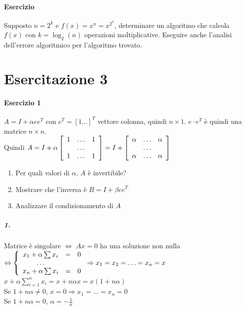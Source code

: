 \documentclass[10pt]{book}
\begin{document}
\paragraph{Esercizio} Supposto $n = 2^k$ e $f(x) = x^n = x^{2^k}$, determinare un algoritmo che calcola $f(x)$ con $k = \log_2(n)$ operazioni moltiplicative. Eseguire anche l'analisi dell'errore algoritmico per l'algoritmo trovato.
\pagebreak
\section{Esercitazione 3}
\paragraph{Esercizio 1}
$A = I + \alpha e e^T$ con $e^T = [1\ldots ]^T$ vettore colonna, quindi $n \times 1$. $e\cdot e^T$ è quindi una matrice $n \times n$.\\
Quindi $A = I + \alpha\left[
\begin{array}{c c c}
	1 & \ldots & 1\\
	 & \ldots\\
	1 & \ldots & 1
\end{array}
\right]
= I + \left[
\begin{array}{c c c}
	\alpha & \ldots & \alpha\\
	 & \ldots\\
	\alpha & \ldots & \alpha
\end{array}
\right]
$
\begin{enumerate}
	\item Per quali valori di $\alpha$, $A$ è invertibile?
	\item Mostrare che l'inversa è $B = I + \beta e e^T$
	\item Analizzare il condizionamento di $A$
\end{enumerate}
\subparagraph{1.} Matrice è singolare $\Leftrightarrow$ $Ax = 0$ ha una soluzione non nulla $\Leftrightarrow \left\{ \begin{array}{c c c}
	x_1 + \alpha \sum x_i & = & 0\\
	\ldots\\
	x_n + \alpha \sum x_i & = & 0
\end{array}
\right.
\Rightarrow x_1 = x_2 = \ldots = x_n = x
$\\
$x + \alpha \sum _{i = 1}^n x_i = x + n \alpha x = x (1 + n\alpha)$\\
Se $1 + n\alpha \neq 0$, $x = 0 \Rightarrow x_1 = \ldots = x_n = 0$\\
Se $1 + n\alpha = 0$, $\alpha = -\frac{1}{n}$\\
\end{document}
